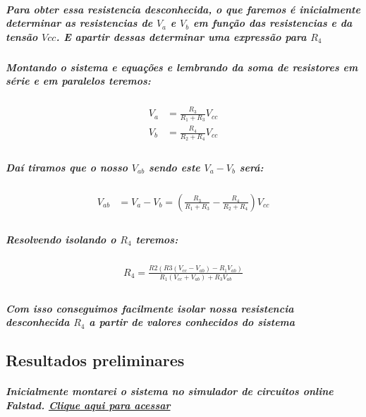 \documentclass[12pt,twoside, a4paper, twocolumn]{article}
\begin{document}
\subparagraph*{Para obter essa resistencia desconhecida, o que faremos é inicialmente determinar as resistencias de $V_a$ e $V_b$ em função das resistencias e da tensão $Vcc$. E apartir dessas determinar uma expressão para $R_4$ }

\subparagraph*{Montando o sistema e equações e lembrando da soma de resistores em série e em paralelos teremos: }

\begin{equation}
    \begin{aligned}
        V_{a} & = \frac{R_3}{R_1+R_3}V_{cc} \\
        V_{b} & = \frac{R_4}{R_2+R_4}V_{cc} \\
    \end{aligned}
\end{equation}

\subparagraph*{Daí tiramos que o nosso $V_{ab}$ sendo este $V_a - V_b$ será:}

\begin{equation}
    \begin{aligned}
        V_{ab} & = V_{a} - V_{b} = \left(\frac{R_3}{R_1+R_3} - \frac{R_4}{R_2+R_4}\right)V_{cc} \\
    \end{aligned}
\end{equation}

\subparagraph*{Resolvendo isolando o $R_4$ teremos:}

\begin{equation}
    \begin{aligned}
        R_4 = \frac{R2(R3(V_{cc} - V_{ab}) - R_1V_{ab})}{R_1 (V_{cc} + V_{ab}) +R_3V_{ab}} \\
    \end{aligned}
\end{equation}

\subparagraph*{Com isso conseguimos facilmente isolar nossa resistencia desconhecida $R_4$ a partir de valores conhecidos do sistema}

\subsection{Resultados preliminares}


\subparagraph*{ Inicialmente montarei o sistema no simulador de circuitos online Falstad. \href{https://www.falstad.com/circuit/circuitjs.html?ctz=CQAgjCAMB0l3BWcMBMcUHYMGZIA4UA2ATmIxAUgoqoQFMBaMMAKADcQUAWKlPPTjxDFCUMULBUpUaAhYB3QVREhsCFMNGQFq9ZpBcuAldoBOBo-sMCwhaVwzwd18HYsCU3KC3MvPXd05+MUknRT9g7l5gs10NFTUNMAwtcEo4HUTwFLjOL1is-yUggV40DIAHXKK-LwgpFiqXWypagPrvIA}{Clique aqui para acessar}}
\end{document}
